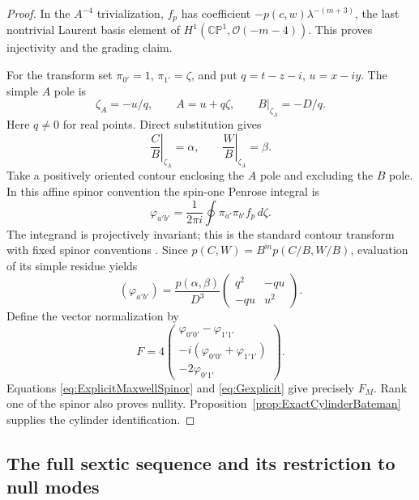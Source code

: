 \documentclass[aps,prd,reprint,nofootinbib,superscriptaddress]{revtex4-2}
\theoremstyle{definition}
\theoremstyle{remark}
\newcommand{\CP}{\mathbb{CP}}
\newcommand{\cO}{\mathcal{O}}
\begin{document}
\begin{proof}
In the $A^{-4}$ trivialization, $f_p$ has coefficient
$-p(c,w)\lambda^{-(m+3)}$, the last nontrivial Laurent basis element of $H^1(\CP^1,\cO(-m-4))$. This proves injectivity and the grading claim.

For the transform set $\pi_{0'}=1$, $\pi_{1'}=\zeta$, and put $q=t-z-i$, $u=x-iy$. The simple $A$ pole is
\begin{equation}
\zeta_A=-u/q,
\qquad A=u+q\zeta,
\qquad B|_{\zeta_A}=-D/q.
\label{eq:PenrosePole}
\end{equation}
Here $q\ne0$ for real points. Direct substitution gives
\begin{equation}
\left.\frac CB\right|_{\zeta_A}=\alpha,
\qquad
\left.\frac WB\right|_{\zeta_A}=\beta.
\label{eq:PenroseRatios}
\end{equation}
Take a positively oriented contour enclosing the $A$ pole and excluding the $B$ pole. In this affine spinor convention the spin-one Penrose integral is
\begin{equation}
\varphi_{a'b'}=
\frac{1}{2\pi i}\oint
\pi_{a'}\pi_{b'} f_p\,d\zeta.
\label{eq:ExplicitPenroseIntegral}
\end{equation}
The integrand is projectively invariant; this is the standard contour transform with fixed spinor conventions \cite{WardWells1990}. Since $p(C,W)=B^mp(C/B,W/B)$, evaluation of its simple residue yields
\begin{equation}
(\varphi_{a'b'})=
\frac{p(\alpha,\beta)}{D^3}
\begin{pmatrix}q^2&-qu\\-qu&u^2\end{pmatrix}.
\label{eq:ExplicitMaxwellSpinor}
\end{equation}
Define the vector normalization by
\begin{equation}
F=4\begin{pmatrix}
\varphi_{0'0'}-\varphi_{1'1'}\\
-i(\varphi_{0'0'}+\varphi_{1'1'})\\
-2\varphi_{0'1'}
\end{pmatrix}.
\label{eq:SpinorVectorConvention}
\end{equation}
Equations \eqref{eq:ExplicitMaxwellSpinor} and \eqref{eq:Gexplicit} give precisely $F_M$. Rank one of the spinor also proves nullity. Proposition~\ref{prop:ExactCylinderBateman} supplies the cylinder identification.
\end{proof}

\subsection{The full sextic sequence and its restriction to null modes}
\end{document}
